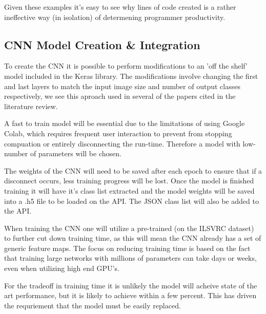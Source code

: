   Given these examples it's easy to see why lines of code created is a rather ineffective way (in isolation) of determening programmer productivity.

 \subsection{CNN Model Creation \& Integration}
  To create the CNN it is possible to perform modifications to an 'off the shelf' model included in the Keras library. The modifications involve changing the first and last layers to match the input image size and number of output classes respectively, we see this aproach used in several of the papers cited in the literature review.
  \par
  A fast to train model will be essential due to the limitations of using Google Colab, which requires frequent user interaction to prevent from stopping compuation or entirely disconnecting the run-time. Therefore a model with low-number of parameters will be chosen.
  \par
  The weights of the CNN will need to be saved after each epoch to ensure that if a disconnect occurs, less training progress will be lost. Once the model is finished training it will have it's class list extracted and the model weights will be saved into a .h5 file to be loaded on the API. The JSON class list will also be added to the API.
  \par
  When training the CNN one will utilize a pre-trained (on the ILSVRC dataset) to further cut down training time, as this will mean the CNN already has a set of generic feature maps. The focus on reducing training time is based on the fact that training large networks with millions of parameters can take days or weeks, even when utilizing high end GPU's.
  \par
  For the tradeoff in training time it is unlikely the model will acheive state of the art performance, but it is likely to achieve within a few percent. This has driven the requriement that the model must be easily replaced.

